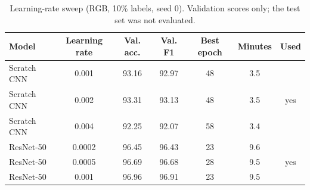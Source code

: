 \begin{table}[t]
\centering
\caption{Learning-rate sweep (RGB, 10\% labels, seed 0). Validation scores only; the test set was not evaluated.}
\label{tab:lr_sweep}
\small
\begin{tabular}{lcccccc}
\toprule
Model & Learning rate & Val. acc. & Val. F1 & Best epoch & Minutes & Used \\
\midrule
Scratch CNN & 0.001 & 93.16 & 92.97 & 48 & 3.5 &  \\
Scratch CNN & 0.002 & 93.31 & 93.13 & 48 & 3.5 & yes \\
Scratch CNN & 0.004 & 92.25 & 92.07 & 58 & 3.4 &  \\
ResNet-50 & 0.0002 & 96.45 & 96.43 & 23 & 9.6 &  \\
ResNet-50 & 0.0005 & 96.69 & 96.68 & 28 & 9.5 & yes \\
ResNet-50 & 0.001 & 96.96 & 96.91 & 23 & 9.5 &  \\
\bottomrule
\end{tabular}
\end{table}
